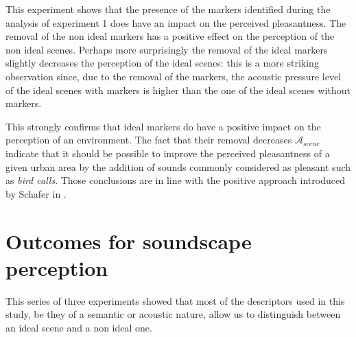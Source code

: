 \documentclass[12pt]{elsarticle}
\begin{document}
This experiment shows that the presence of the markers identified during the analysis of experiment 1 does have an impact on the perceived pleasantness. The removal of the non ideal markers has a positive effect on the perception of the non ideal scenes. Perhaps more surprisingly the removal of the ideal markers slightly decreases the perception of the ideal scenes: this is a more striking observation since, due to the removal of the markers, the acoustic pressure level of the ideal scenes with markers is higher than the one of the ideal scenes without markers.


This strongly confirms that ideal markers do have a positive impact on the perception of an environment. The fact that their removal decreases $\mathcal{A}_{scene}$ indicate that it should be possible to improve the perceived pleasantness of a given urban area by the addition of sounds commonly considered as pleasant such as \emph{bird calls}. Those conclusions are in line with the positive approach introduced by Schafer in \cite{schafer1977tuning}.



\section{Outcomes for soundscape perception}
\label{sec:conclusion}

This series of three experiments showed that most of the descriptors used in this study, be they of a semantic or acoustic nature, allow us to distinguish between an ideal scene and a non ideal one.

\end{document}
